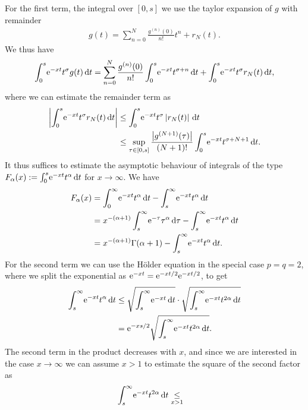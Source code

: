 \begin{Theorem}
\begin{Proof}
    For the first term, the integral over $\left[0,s\right]$ we use the
    taylor expansion of $g$ with remainder
    \begin{align*}
      g(t) = \sum_{n=0}^{N} \frac{g^{(n)}(0)}{n!}t^n + r_N(t).
    \end{align*}
    We thus have
    \begin{align*}
      \Integ[s]0t{\Eto{-xt}t^\sigma g(t)} = \sum_{n=0}^N
      \frac{g^{(n)}(0)}{n!} \Integ[s]0t{\Eto{-xt}t^{\sigma+n}} +
      \Integ[s]0t{\Eto{-xt}t^\sigma r_N(t)},
    \end{align*}
    where we can estimate the remainder term as
    \begin{align*}
      \left|\Integ[s]0t{\Eto{-xt}t^\sigma r_N(t)}\right| &\le
      \Integ[s]0t{\Eto{-xt}t^\sigma\left|r_N(t)\right|} \\
      &\le \sup_{\tau\in\left[0,s\right]}
      \frac{\bigl|g^{(N+1)}(\tau)\bigr|}{(N+1)!}\Integ[s]0t{\Eto{-xt}t^{\sigma+N+1}}.
    \end{align*}
    It thus suffices to estimate the asymptotic behaviour of integrals of
    the type $F_\alpha(x) := \Integ[s]0t{\Eto{-xt}t^\alpha}$ for
    $x\to\infty$. We have
    \begin{align*}
      F_\alpha(x) &= \Integ[\infty]{0}{t}{\Eto{-xt}t^\alpha} -
      \Integ[\infty]{s}{t}{\Eto{-xt}t^\alpha} \\
      &= x^{-(\alpha+1)}\Integ[\infty]{s}{\tau}{\Eto{-\tau}\tau^\alpha} -
      \Integ[\infty]{s}{t}{\Eto{-xt}t^\alpha} \\
      &= x^{-(\alpha+1)}\Gamma(\alpha + 1) - 
      \Integ[\infty]{s}{t}{\Eto{-xt}t^\alpha}.
    \end{align*}
    For the second term we can use the Hölder equation in the special case
    $p=q=2$, where we split the exponential as $\Eto{-xt} =
    \Eto{-xt/2}\Eto{-xt/2}$, to get
    \begin{align*}
      \Integ[\infty]{s}{t}{\Eto{-xt}t^\alpha} &\le
      \sqrt{\Integ[\infty]{s}{t}{\Eto{-xt}}} \cdot
      \sqrt{\Integ[\infty]{s}{t}{\Eto{-xt}t^{2\alpha}}} \\
      &= \Eto{-xs/2} \sqrt{\Integ[\infty]{s}{t}{\Eto{-xt}t^{2\alpha}}}.
    \end{align*}
    The second term in the product decreases with $x$, and since we are
    interested in the case $x\to\infty$ we can assume $x>1$ to estimate the
    square of the second factor as
    \begin{align*}
      \Integ[\infty]{s}{t}{\Eto{-xt}t^{2\alpha}} &\underset{x>1}\le

\end{align*}
\end{Proof}
\end{Theorem}
